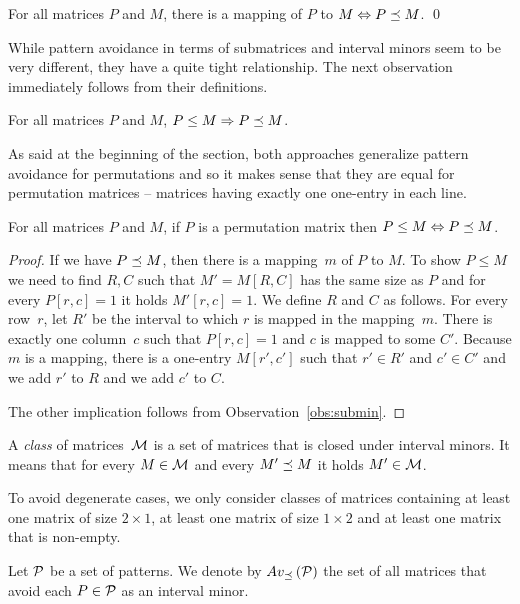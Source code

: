 \begin{obs}
For all matrices $P$ and $M$, there is a mapping of $P$ to $M\Leftrightarrow P\preceq M$. \qed
\end{obs}

While pattern avoidance in terms of submatrices and interval minors seem to be very different, they have a quite tight relationship. The next observation immediately follows from their definitions.

\begin{obs}
\label{obs:submin}
For all matrices $P$ and $M$, $P\leq M\Rightarrow P\preceq M$.
\end{obs}

As said at the beginning of the section, both approaches generalize pattern avoidance for permutations and so it makes sense that they are equal for permutation matrices -- matrices having exactly one one-entry in each line.

\begin{obs}
\label{obs:perm}
For all matrices $P$ and $M$, if $P$ is a permutation matrix then $P\leq M\Leftrightarrow P\preceq M$.
\end{obs}
\begin{proof}
If we have $P\preceq M$, then there is a mapping~$m$ of $P$ to $M$. To show $P\leq M$ we need to find $R,C$ such that $M'=M[R,C]$ has the same size as $P$ and for every $P[r,c]=1$ it holds $M'[r,c]=1$. We define $R$ and $C$ as follows. For every row~$r$, let $R'$ be the interval to which $r$ is mapped in the mapping~$m$. There is exactly one column~$c$ such that $P[r,c]=1$ and $c$ is mapped to some $C'$. Because $m$ is a mapping, there is a one-entry $M[r',c']$ such that $r'\in R'$ and $c'\in C'$ and we add $r'$ to $R$ and we add $c'$ to $C$.

The other implication follows from Observation~\ref{obs:submin}.
\end{proof}

\begin{defn}
A \emph{class} of matrices~$\mathcal{M}$ is a set of matrices that is closed under interval minors. It means that for every $M\in\mathcal{M}$ and every $M'\preceq M$ it holds $M'\in\mathcal{M}$.
\end{defn}

To avoid degenerate cases, we only consider classes of matrices containing at least one matrix of size $2\times1$, at least one matrix of size $1\times2$ and at least one matrix that is non-empty.

\begin{defn}
Let $\mathcal{P}$ be a set of patterns. We denote by $Av_{\preceq}\left(\mathcal{P}\right)$ the set of all matrices that avoid each $P\in\mathcal{P}$ as an interval minor.
\end{defn}


